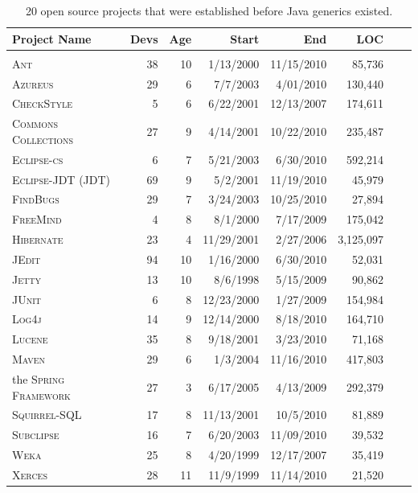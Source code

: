 \documentclass{svjour3}
\newcommand{\squirrelsql}{\textsc{Squirrel-SQL}\xspace}
\newcommand{\eclipsecs}{\textsc{Eclipse-cs}\xspace}
\newcommand{\azureus}{\textsc{Azureus}\xspace}
\newcommand{\jedit}{\textsc{JEdit}\xspace}
\newcommand{\spring}{the \textsc{Spring Framework}\xspace}
\newcommand{\junit}{\textsc{JUnit}\xspace}
\newcommand{\maven}{\textsc{Maven}\xspace}
\newcommand{\lucene}{\textsc{Lucene}\xspace}
\newcommand{\jdt}{\textsc{JDT}\xspace}
\newcommand{\hibernate}{\textsc{Hibernate}\xspace}
\newcommand{\commons}{\textsc{Commons Collections}\xspace}
\newcommand{\weka}{\textsc{Weka}\xspace}
\newcommand{\findbugs}{\textsc{FindBugs}\xspace}
\newcommand{\checkstyle}{\textsc{CheckStyle}\xspace}
\newcommand{\logfourj}{\textsc{Log4j}\xspace}
\newcommand{\xerces}{\textsc{Xerces}\xspace}
\newcommand{\ant}{\textsc{Ant}\xspace}
\newcommand{\freemind}{\textsc{FreeMind}\xspace}
\newcommand{\jetty}{\textsc{Jetty}\xspace}
\newcommand{\subclipse}{\textsc{Subclipse}\xspace}
\begin{document}
\begin{table}[ht]

\begin{center}
\begin{tabular*}{12.5cm}{@{\extracolsep{\fill}}p{4cm}rrrrrrr}

\textbf{Project Name} &\textbf{Devs}&\textbf{Age}&\textbf{Start}&\textbf{End}&	 \textbf{LOC} \\
\hline\\
\ant	         							&	38		&	10	&	1/13/2000 	&	11/15/2010 	&		85,736	\\[1mm]
\azureus	    							&	29		&	6		&	7/7/2003 		&	4/01/2010 	&		130,440	\\[1mm]
\checkstyle									&	5			&	6		&	6/22/2001 	&	12/13/2007 	&		174,611	\\[1mm]
\commons 										&	27		&	9		&	4/14/2001 	&	10/22/2010 	&		235,487	\\[1mm]
\eclipsecs									&	6			&	7		&	5/21/2003 	&	6/30/2010 	&		592,214	\\[1mm]
\textsc{Eclipse-JDT} (\jdt)	&	69		&	9		&	5/2/2001		&	11/19/2010 	&		45,979	\\[1mm]
\findbugs										&	29		&	7		&	3/24/2003 	&	10/25/2010 	&		27,894	\\[1mm]
\freemind										&	4			&	8		&	8/1/2000 		&	7/17/2009 	&		175,042	\\[1mm]
\hibernate									&	23		&	4		&	11/29/2001 	&	2/27/2006		&		3,125,097	\\[1mm]
\jedit											&	94		&	10	&	1/16/2000 	&	6/30/2010 	&		52,031	\\[1mm]
\jetty											&	13		&	10	&	8/6/1998 		&	5/15/2009 	&		90,862	\\[1mm]
\junit											&	6			&	8		&	12/23/2000 	&	1/27/2009 	&		154,984	\\[1mm]
\logfourj										&	14		&	9		&	12/14/2000 	&	8/18/2010 	&		164,710	\\[1mm]
\lucene											&	35		&	8		&	9/18/2001 	&	3/23/2010 	&		71,168	\\[1mm]
\maven											&	29		&	6		&	1/3/2004 		&	11/16/2010 	&		417,803	\\[1mm]
\spring											&	27		&	3		&	6/17/2005 	&	4/13/2009 	&		292,379	\\[1mm]
\squirrelsql								&	17		&	8		&	11/13/2001 	&	10/5/2010 	&		81,889	\\[5mm]
\subclipse									&	16		&	7		&	6/20/2003 	&	11/09/2010 	&		39,532	\\[1mm]
\weka												&	25		&	8		&	4/20/1999 	&	12/17/2007 	&		35,419	\\[1mm]
\xerces											&	28		&	11	&	11/9/1999 	&	11/14/2010 	&		21,520	\\[1mm] 
\end{tabular*}
\end{center}
\caption{20 open source projects that were established before Java generics existed.}
\label{table:20establishedprojects}
\end{table}
\end{document}
